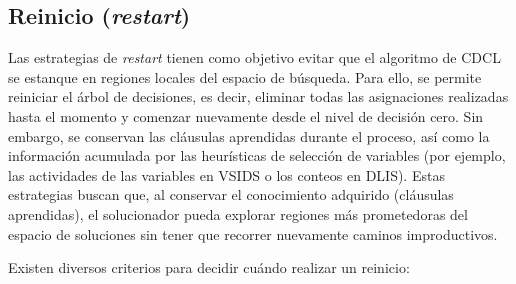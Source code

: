 \subsection{Reinicio (\textit{restart})}
\label{subsec:restart}

Las estrategias de \textit{restart} tienen como objetivo evitar que el algoritmo de CDCL se estanque en regiones locales del espacio de búsqueda. Para ello, se permite reiniciar el árbol de decisiones, es decir, eliminar todas las asignaciones realizadas hasta el momento y comenzar nuevamente desde el nivel de decisión cero. Sin embargo, se conservan las cláusulas aprendidas durante el proceso, así como la información acumulada por las heurísticas de selección de variables (por ejemplo, las actividades de las variables en VSIDS o los conteos en DLIS). Estas estrategias buscan que, al conservar el conocimiento adquirido (cláusulas aprendidas), el solucionador pueda explorar regiones más prometedoras del espacio de soluciones sin tener que recorrer nuevamente caminos improductivos.

Existen diversos criterios para decidir cuándo realizar un reinicio:

